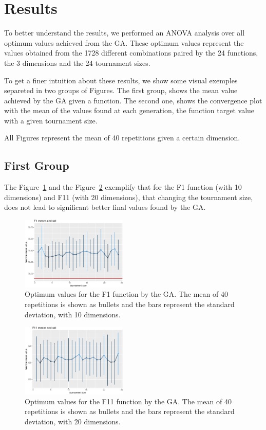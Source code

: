 \section{Results}\label{sec:results}

To better understand the results, we performed an ANOVA analysis over all optimum values achieved from the GA. These optimum values represent the values obtained from the 1728 different combinations paired by the 24 functions, the 3 dimensions and the 24 tournament sizes.

To get a finer intuition about these results, we show  some visual exemples separeted in two groups of Figures. The first group, shows the mean value achieved by the GA given a function. The second one, shows the convergence plot with the mean of the values found at each generation, the function target value with a given tournament size.

All Figures represent the mean of 40 repetitions given a certain dimension.

\subsection{First Group}
The Figure~\ref{tournsizeF1} and the Figure~\ref{tournsizeF11} exemplify that for the F1 function (with 10 dimensions) and F11 (with 20 dimensions), that changing the tournament size, does not lead to significant better final values found by the GA.


\begin{figure}[!ht]
	\includegraphics[width=0.45\textwidth]{img/pressure-1}
	\caption{Optimum values for the F1 function by the GA. The mean of 40 repetitions is shown as bullets and the bars represent the standard deviation, with 10 dimensions.}
	\label{tournsizeF1}
\end{figure}

\begin{figure}[!ht]
	\includegraphics[width=0.45\textwidth]{img/pressure-21}
	\caption{Optimum values for the F11 function by the GA. The mean of 40 repetitions is shown as bullets and the bars represent the standard deviation, with 20 dimensions.}
	\label{tournsizeF11}
\end{figure}

